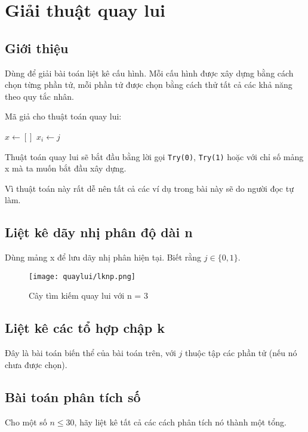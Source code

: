 \chapter{Giải thuật quay lui}
\section{Giới thiệu}
Dùng để giải bài toán liệt kê cấu hình. Mỗi cấu hình được xây dựng bằng cách chọn từng phần tử, mỗi phần tử được chọn bằng cách thử tất cả các khả năng theo quy tắc nhân.

Mã giả cho thuật toán quay lui:
\begin{algorithmic}
    \State $x\gets[]$
            \State $x_i\gets j$
            \Else
                \State{}
            \EndIf
        \EndFor
    \EndFunction
\end{algorithmic}

Thuật toán quay lui sẽ bắt đầu bằng lời gọi \texttt{Try(0)}, \texttt{Try(1)} hoặc với chỉ số mảng x mà ta muốn bắt đầu xây dựng.

Vì thuật toán này rất dễ nên tất cả các ví dụ trong bài này sẽ do người đọc tự làm.

\section{Liệt kê dãy nhị phân độ dài n}
Dùng mảng x để lưu dãy nhị phân hiện tại. Biết rằng $j\in\{0,1\}$.
\begin{figure}[h]
    \texttt{[image: quaylui/lknp.png]}
    \caption{Cây tìm kiếm quay lui với n = 3}
\end{figure}

\section{Liệt kê các tổ hợp chập k}
Đây là bài toán biến thể của bài toán trên, với $j$ thuộc tập các phần tử (nếu nó chưa được chọn).

\section{Bài toán phân tích số}
Cho một số $n\leq30$, hãy liệt kê tất cả các cách phân tích nó thành một tổng.

